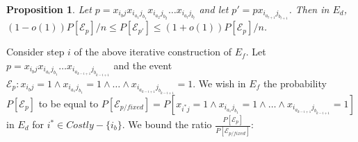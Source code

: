 \documentclass[11pt]{article}
\newtheorem{proposition}{Proposition}[section]
\newcommand{\qed}{\hfill \mbox{\raggedright \rule{2mm}{3mm}}}
\newenvironment{proof}{\noindent{\bf Proof.}}{\qed}
\begin{document}
\vspace*{-0.1cm}
\begin{proposition}\label{level-ratio}
Let $p=x_{i_bj} x_{i_{a_1}j_{b_1}} x_{i_{a_2}j_{b_2}}\ldots  x_{i_{a_{l}}j_{b_{l}}}$ and let $p'=px_{i_{a_{l+1}}j_{b_{l+1}}}$. Then
in $E_d$, $(1-o(1)){P[\mathcal{E}_p]}/{n}\leq P[\mathcal{E}_{p'}] \leq (1+o(1)){P[\mathcal{E}_p]}/{n}$.
\end{proposition}
\vspace*{-0.1cm}

\begin{comment}
\begin{proof}
Since the considered distribution is assignment-symmetric, event $\mathcal{E}_p$ is equivalent  to the event 
of randomly distributing $l+1$ balls to the slots of $n+1$ bins, with at most one ball in each slot, each bin having $w^1_{ch}$ identical slots, asking that ball $j$ is tossed in the bin of $i_b$ and ball $j_{r}$ is tossed in bin $i_{r}$. Since there are $\Theta (n^3)$ slots in each bin and the balls are at most $n$, it is easy to see
that $(1-o(1))\frac{P[\mathcal{E}_p]}{n} \leq P[\mathcal{E}_{p'}] \leq (1+o(1))\frac{P[\mathcal{E}_p]}{n}$.
\end{proof}
\end{comment}

\iffalse---------- expanded version 
\begin{sloppypar}
Consider step $i$ of the above iterative construction of $E_f$. Let
$p=x_{i_bj} x_{i_{a_1}j_{b_1}}
x_{i_{a_2}j_{b_2}}\ldots x_{i_{a_{k-i+1}}j_{b_{k-i+1}}}$ and the event
$\mathcal{E}_p \colon x_{i_bj}=1 \wedge x_{i_{a_1}j_{b_1}}=1 \wedge
x_{i_{a_2}j_{b_2}}=1 \wedge \ldots \wedge
x_{i_{a_{k-i+1}}j_{b_{k-i+1}}}=1$. We wish in $E_f$ the probability
$P[\mathcal{E}_p]$ to be equal to
$P[\mathcal{E}_{p/fixed}]=P[x_{i^*j}=1  \wedge x_{i_{a_1}j_{b_1}}=1
  \wedge x_{i_{a_2}j_{b_2}}=1 \wedge \ldots \wedge
  x_{i_{a_{k-i+1}}j_{b_{k-i+1}}}=1]$ in $E_d$ for $i^*\in
Costly-\{i_b\}$. We bound the ratio $\frac{P[\mathcal{E}_p]}{P[\mathcal{E}_{p/fixed}]}\colon$
\end{sloppypar}
----------- end expanded version \fi 
\begin{sloppypar}
Consider step $i$ of the above iterative construction of $E_f$. Let
$p=x_{i_bj} x_{i_{a_1}j_{b_1}}\ldots x_{i_{a_{k-i+1}}j_{b_{k-i+1}}}$ and the event
$\mathcal{E}_p \colon x_{i_bj}=1 \wedge x_{i_{a_1}j_{b_1}}=1 \wedge
\ldots \wedge
x_{i_{a_{k-i+1}}j_{b_{k-i+1}}}=1$. We wish in $E_f$ the probability
$P[\mathcal{E}_p]$ to be equal to
$P[\mathcal{E}_{p/fixed}]=P[x_{i^*j}=1  \wedge x_{i_{a_1}j_{b_1}}=1
  \wedge  \ldots \wedge
  x_{i_{a_{k-i+1}}j_{b_{k-i+1}}}=1]$ in $E_d$ for $i^*\in
Costly-\{i_b\}$. We bound the ratio $\frac{P[\mathcal{E}_p]}{P[\mathcal{E}_{p/fixed}]}\colon$
\end{sloppypar}
\end{document}
